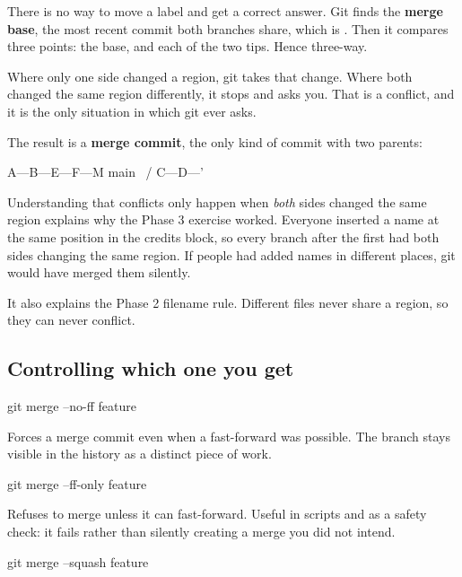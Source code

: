 \documentclass[11pt]{article}
\begin{document}
There is no way to move a label and get a correct answer. Git finds the \textbf{merge
base}, the most recent commit both branches share, which is . Then it compares
three points: the base, and each of the two tips. Hence three-way.

Where only one side changed a region, git takes that change. Where both changed the
same region differently, it stops and asks you. That is a conflict, and it is the
only situation in which git ever asks.

The result is a \textbf{merge commit}, the only kind of commit with two parents:

\begin{terminal}
A---B---E---F---M  main
     \         /
      C---D---'
\end{terminal}

\begin{why}
Understanding that conflicts only happen when \emph{both} sides changed the same
region explains why the Phase 3 exercise worked. Everyone inserted a name at the
same position in the credits block, so every branch after the first had both sides
changing the same region. If people had added names in different places, git would
have merged them silently.

It also explains the Phase 2 filename rule. Different files never share a region, so
they can never conflict.
\end{why}

\subsection{Controlling which one you get}

\begin{shell}
git merge --no-ff feature
\end{shell}

Forces a merge commit even when a fast-forward was possible. The branch stays
visible in the history as a distinct piece of work.

\begin{shell}
git merge --ff-only feature
\end{shell}

Refuses to merge unless it can fast-forward. Useful in scripts and as a safety
check: it fails rather than silently creating a merge you did not intend.

\begin{shell}
git merge --squash feature
\end{shell}
\end{document}
